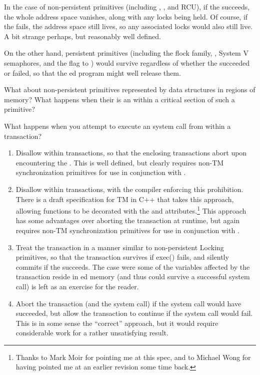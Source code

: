 In the case of non-persistent primitives (including
, , and RCU),
if the  succeeds, the whole address space vanishes, along
with any locks being held.
Of course, if the  fails, the address space still lives,
so any associated locks would also still live.
A bit strange perhaps, but reasonably well defined.

On the other hand, persistent primitives (including the flock family,
, System V semaphores, and the  flag to
) would survive regardless of whether the 
succeeded or failed, so that the ed program might well
release them.

\QuickQuiz{}
	What about non-persistent primitives represented by data
	structures in  regions of memory?
	What happens when their is an  within a critical
	section of such a primitive?
 \QuickQuizEnd

What happens when you attempt to execute an  system call
from within a transaction?

\begin{enumerate}
\item	Disallow  within transactions, so that the enclosing
	transactions abort upon encountering the .
	This is well defined, but clearly requires non-TM synchronization
	primitives for use in conjunction with .
\item	Disallow  within transactions, with the compiler
	enforcing this prohibition.
	There is a draft specification for TM in C++ that takes
	this approach, allowing functions to be decorated with
	the  and 
	attributes.\footnote{
		Thanks to Mark Moir for pointing me at this spec, and
		to Michael Wong for having pointed me at an earlier
		revision some time back.}
	This approach has some advantages over aborting the transaction
	at runtime, but again requires non-TM synchronization primitives
	for use in conjunction with .
\item	Treat the transaction in a manner similar to non-persistent	
	Locking primitives, so that the transaction survives if exec()
	fails, and silently commits if the  succeeds.
	The case were some of the variables affected by the transaction
	reside in ed memory (and thus could survive a successful
	 system call) is left as an exercise for the reader.
\item	Abort the transaction (and the  system call) if the
	 system call would have succeeded, but allow the
	transaction to continue if the  system call would
	fail.
	This is in some sense the ``correct'' approach, but it would
	require considerable work for a rather unsatisfying result.
\end{enumerate}

